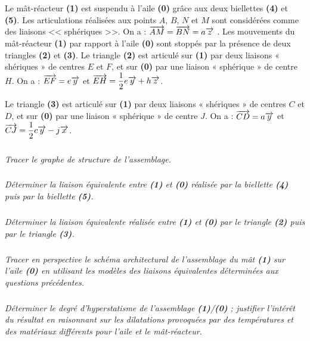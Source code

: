 \documentclass[10pt,fleqn]{article} %
\begin{document}
\begin{multicols}{2}
\begin{multicols}{2}
Le mât-réacteur \textbf{(1)} est suspendu à l’aile \textbf{(0)} grâce aux deux biellettes \textbf{(4)} et \textbf{(5)}.
Les articulations réalisées aux points $A$, $B$, $N$ et $M$ sont considérées comme des liaisons << sphériques >>. On a : $\overrightarrow{AM}=\overrightarrow{BN}=a\overrightarrow{z}$ .
Les mouvements du mât-réacteur \textbf{(1)} par rapport à l’aile \textbf{(0)} sont stoppés par la présence de deux triangles \textbf{(2)} et \textbf{(3)}. Le triangle \textbf{(2)} est articulé sur \textbf{(1)} par deux liaisons « shériques » de centres $E$ et $F$, et sur \textbf{(0)} par une liaison « sphérique » de centre $H$. On a : $\overrightarrow{EF}=e\overrightarrow{y}$ et $\overrightarrow{EH}=\dfrac{1}{2}e\overrightarrow{y}+h\overrightarrow{z}$.

Le triangle \textbf{(3)} est articulé sur \textbf{(1)} par deux liaisons « shériques » de centres $C$ et $D$, et sur \textbf{(0)} par une liaison « sphérique » de centre $J$. On a : $\overrightarrow{CD}=a\overrightarrow{y}$  et  $\overrightarrow{CJ}=\dfrac{1}{2}c\overrightarrow{y}-j\overrightarrow{x}$.

\subparagraph{}\textit{Tracer le graphe de structure de l’assemblage.}
\subparagraph{}\textit{Déterminer la liaison équivalente entre \textbf{(1)} et \textbf{(0)} réalisée par la biellette \textbf{(4)} puis par la biellette \textbf{(5)}.}
\subparagraph{}\textit{Déterminer la liaison équivalente réalisée entre \textbf{(1)} et \textbf{(0)} par le triangle \textbf{(2)} puis par le triangle \textbf{(3)}.}
\subparagraph{}\textit{Tracer en perspective le schéma architectural de l’assemblage du mât \textbf{(1)} sur l’aile \textbf{(0)} en utilisant les modèles des liaisons équivalentes déterminées aux questions précédentes.}
\subparagraph{}\textit{Déterminer le degré d’hyperstatisme de l’assemblage \textbf{(1)}/\textbf{(0)} ; justifier l’intérêt du résultat en raisonnant sur les dilatations provoquées par des températures et des matériaux différents pour l’aile et le mât-réacteur.}






\ifprof
\end{multicols}
\else
\end{multicols}
\fi
\end{document}
